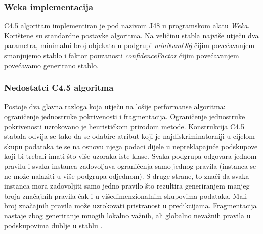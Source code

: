 \subsubsection{Weka implementacija}
C4.5 algoritam implementiran je pod nazivom J48 u programskom alatu \textit{Weka}. Korištene su standardne postavke algoritma. Na veličinu stabla najviše utječu dva parametra, minimalni broj objekata u podgrupi \textit{minNumObj} čijim povećavanjem smanjujemo stablo i faktor pouzanosti \textit{confidenceFactor} čijim povećavanjem povećavamo generirano stablo.

\subsubsection{Nedostatci C4.5 algoritma}
Postoje dva glavna razloga koja utječu na lošije performanse algoritma: ograničenje jednostruke pokrivenosti i fragmentacija. Ograničenje jednostruke pokrivenosti uzrokovano je heurističkom prirodom metode. Konstrukcija C4.5 stabala odvija se tako da se odabire atribut koji je najdiskriminatorniji u cijelom skupu podataka te se na osnovu njega podaci dijele u nepreklapajuće podskupove koji bi trebali imati što više uzoraka iste klase. Svaka podgrupa odgovara jednom pravilu i svaka instanca zadovoljava ograničenja samo jednog pravila (instanca se ne može nalaziti u više podgrupa odjednom). S druge strane, to znači da svaka instanca mora zadovoljiti samo jedno pravilo što rezultira generiranjem manjeg broja značajnih pravila čak i u višedimenzionalnim skupovima podataka. Mali broj značajnih pravila može uzrokovati pristranost u predikcijama. Fragmentacija nastaje zbog generiranje mnogih lokalno važnih, ali globalno nevažnih pravila u podskupovima dublje u stablu \cite{Li01}.
